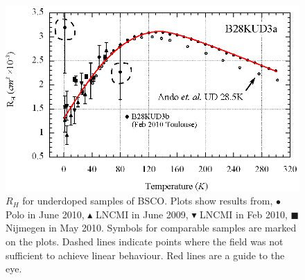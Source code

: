 \begin{figure}[htbp]
	\begin{center}
		\includegraphics[scale=0.9]{Chapter-HallBSCO/Figures/HallIndividual/HallIndividualUD}
		\caption{$R_H$ for underdoped samples of \ac{BSCO}. Plots show results from, $\bullet$ Polo in June 2010, $\blacktriangle$ \ac{LNCMI} in June 2009, $\blacktriangledown$ \ac{LNCMI} in Feb 2010, $\blacksquare$ Nijmegen in May 2010. Symbols for comparable samples are marked on the plots. Dashed lines indicate points where the field was not sufficient to achieve linear behaviour. Red lines are a guide to the eye.}
		\label{Fig:ExpH:HallIndividualUD}
	\end{center}
\end{figure}
